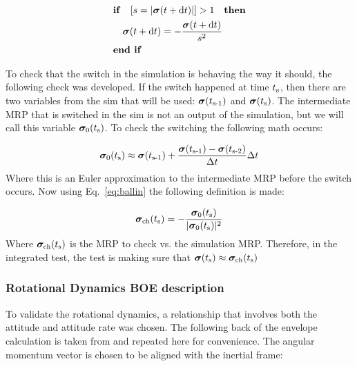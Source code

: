 \begin{equation}
\begin{gathered}
\begin{aligned}
&\textnormal{\textbf{if}}\quad [s = \vert \bm \sigma(t + \D t) \vert ] > 1  \quad \textnormal{\textbf{then}}\\
&\quad \bm \sigma(t + \D t) = - \frac{\bm \sigma(t + \D t)}{s^2}\\
&\textnormal{\textbf{end if}}
\end{aligned}
\end{gathered}
\label{eq:ballin}
\end{equation}

To check that the switch in the simulation is behaving the way it should, the following check was developed. If the switch happened at time $t_\textnormal{s}$, then there are two variables from the sim that will be used: $\bm \sigma(t_\textnormal{s-1})$ and $\bm \sigma(t_\textnormal{s})$. The intermediate MRP that is switched in the sim is not an output of the simulation, but we will call this variable $\bm \sigma_0(t_\textnormal{s})$. To check the switching the following math occurs: 

\begin{equation}
\bm \sigma_0(t_\textnormal{s}) \approx \bm \sigma(t_\textnormal{s-1}) + \frac{\bm \sigma(t_\textnormal{s-1}) - \bm \sigma(t_\textnormal{s-2})}{\Delta t} \Delta t
\end{equation}
Where this is an Euler approximation to the intermediate MRP before the switch occurs. Now using Eq.~\eqref{eq:ballin} the following definition is made:

\begin{equation}
\bm \sigma_{\textnormal{ch}}(t_\textnormal{s}) = - \frac{\bm \sigma_0(t_\textnormal{s})}{\vert \bm \sigma_0(t_\textnormal{s}) \vert^2}
\end{equation}
Where $\bm \sigma_{\textnormal{ch}}(t_\textnormal{s})$ is the MRP to check vs. the simulation MRP. Therefore, in the integrated test, the test is making sure that $ \bm \sigma(t_\textnormal{s}) \approx \bm \sigma_{\textnormal{ch}}(t_\textnormal{s})$

\subsubsection{Rotational Dynamics BOE description}

To validate the rotational dynamics, a relationship that involves both the attitude and attitude rate was chosen. The following back of the envelope calculation is taken from\cite{schaub} and repeated here for convenience. The angular momentum vector is chosen to be aligned with the inertial frame:

